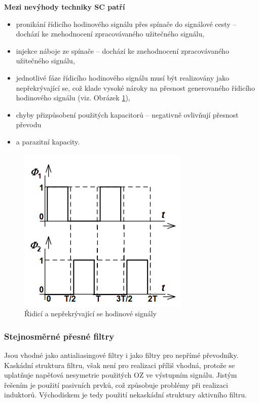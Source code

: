 \textbf{Mezi nevýhody techniky SC patří} 
\begin{itemize}
\item pronikání řídicího hodinového signálu přes spínače do signálové cesty –
dochází ke znehodnocení zpracovávaného užitečného signálu,
\item injekce náboje ze spínače – dochází ke znehodnocení zpracovávaného
užitečného signálu,
\item  jednotlivé fáze řídicího hodinového signálu musí být realizovány jako
nepřekrývající se, což klade vysoké nároky na přesnost generovaného řídicího
hodinového signálu (viz. Obrázek \ref{fig:sig}),
\item chyby přizpůsobení použitých kapacitorů – negativně ovlivňují přesnost
převodu
\item a parazitní kapacity.
\end{itemize}
   \begin{figure}[h]
   \begin{center}
     \includegraphics[scale=0.6]{images/SC_sig.png}
   \end{center}
   \caption{Řidicí a nepřekrývající se hodinové signály}
   \label{fig:sig}
  \end{figure}
\pagebreak
\subsubsection{Stejnosměrné přesné filtry}
Jsou vhodné jako antialiasingové filtry i jako filtry pro nepřímé převodníky. Kaskádní struktura filtru, však není pro realizaci příliš vhodná, protože se uplatňuje napěťová nesymetrie použitých OZ ve výstupním signálu. Jistým řešením je použití pasivních prvků, což způsobuje problémy při realizaci induktorů. Východiskem je tedy použití nekaskádní struktury aktivního filtru.

